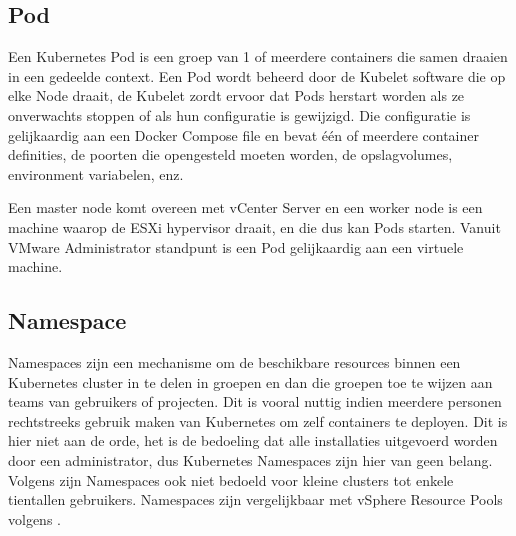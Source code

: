 \subsection{Pod}
Een Kubernetes Pod is een groep van 1 of meerdere containers die samen draaien in een gedeelde context. Een Pod wordt beheerd door de Kubelet software die op elke Node draait, de Kubelet zordt ervoor dat Pods herstart worden als ze onverwachts stoppen of als hun configuratie is gewijzigd. Die configuratie is gelijkaardig aan een Docker Compose file en bevat één of meerdere container definities, de poorten die opengesteld moeten worden, de opslagvolumes, environment variabelen, enz.
\autocite{NirShtein2023}

Een master node komt overeen met vCenter Server en een worker node is een machine waarop de ESXi hypervisor draait, en die dus kan Pods starten. Vanuit VMware Administrator standpunt is een Pod gelijkaardig aan een virtuele machine.\autocite{VMware2019}


\subsection{Namespace}
Namespaces zijn een mechanisme om de beschikbare resources binnen een Kubernetes cluster in te delen in groepen en dan die groepen toe te wijzen aan teams van gebruikers of projecten. Dit is vooral nuttig indien meerdere personen rechtstreeks gebruik maken van Kubernetes om zelf containers te deployen. Dit is hier niet aan de orde, het is de bedoeling dat alle installaties uitgevoerd worden door een administrator, dus Kubernetes Namespaces zijn hier van geen belang. Volgens \textcite{Kubernetes2023c} zijn Namespaces ook niet bedoeld voor kleine clusters tot enkele tientallen gebruikers. Namespaces zijn vergelijkbaar met vSphere Resource Pools volgens \textcite{VMware2019}.
